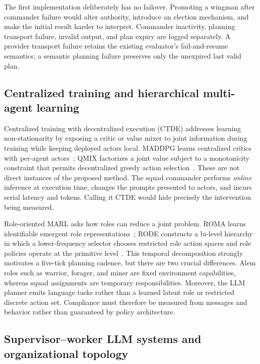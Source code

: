 \documentclass[11pt]{article}
\begin{document}
The first implementation deliberately has no failover.  Promoting a wingman after
commander failure would alter authority, introduce an election mechanism, and make
the initial result harder to interpret.  Commander inactivity, planning transport
failure, invalid output, and plan expiry are logged separately.  A provider
transport failure retains the existing evaluator's fail-and-resume semantics; a
semantic planning failure preserves only the unexpired last valid plan.

\subsection{Centralized training and hierarchical multi-agent learning}

Centralized training with decentralized execution (CTDE) addresses learning
non-stationarity by exposing a critic or value mixer to joint information during
training while keeping deployed actors local.  MADDPG learns centralized critics
with per-agent actors~\citep{lowe2017maddpg}; QMIX factorizes a joint value subject
to a monotonicity constraint that permits decentralized greedy action
selection~\citep{rashid2018qmix}.  These are not direct instances of the proposed
method.  The squad commander performs \emph{online} inference at execution time,
changes the prompts presented to actors, and incurs serial latency and tokens.
Calling it CTDE would hide precisely the intervention being measured.

Role-oriented MARL asks how roles can reduce a joint problem.  ROMA learns
identifiable emergent role representations~\citep{wang2020roma}; RODE constructs a
bi-level hierarchy in which a lower-frequency selector chooses restricted role
action spaces and role policies operate at the primitive level~\citep{wang2021rode}.
This temporal decomposition strongly motivates a five-tick planning cadence, but
there are two crucial differences.  Alem roles such as warrior, forager, and miner
are fixed environment capabilities, whereas squad assignments are temporary
responsibilities.  Moreover, the LLM planner emits language tasks rather than a
learned latent role or restricted discrete action set.  Compliance must therefore
be measured from messages and behavior rather than guaranteed by policy
architecture.

\subsection{Supervisor--worker LLM systems and organizational topology}
\end{document}
